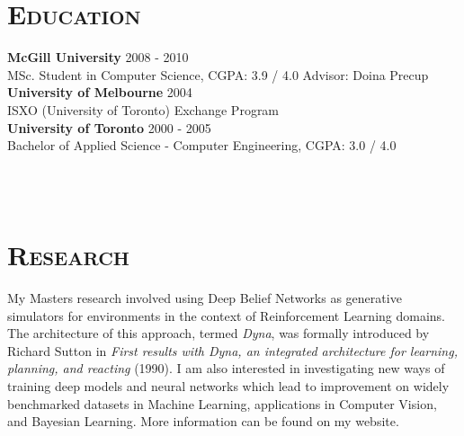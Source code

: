 \begin{resume}




\section{\textsc{Education}}

\textbf{McGill University} \hfill 2008 - 2010 \\
MSc. Student in Computer Science, CGPA: 3.9 / 4.0 \hfill Advisor: Doina Precup \\
\newline
\textbf{University of Melbourne} \hfill 2004 \\ 
ISXO (University of Toronto) Exchange Program \\
\newline
\textbf{University of Toronto} \hfill 2000 - 2005 \\ 
Bachelor of Applied Science - Computer Engineering, CGPA: 3.0 / 4.0


\begin{formatb}
  \\
  \body\\
\end{formatb}

\section{\textsc{Research}}

My Masters research involved using Deep Belief Networks as generative simulators for environments in the context of Reinforcement Learning domains.  The architecture of this approach, termed \emph{Dyna}, was formally introduced by Richard Sutton in \emph{First results with Dyna, an integrated architecture for learning, planning, and reacting} (1990).  I am also interested in investigating new ways of training deep models and neural networks which lead to improvement on widely benchmarked datasets in Machine Learning, applications in Computer Vision, and Bayesian Learning.  More information can be found on my website.


\end{resume}
